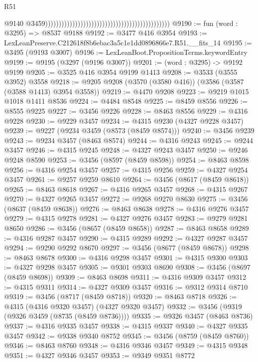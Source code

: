 \begin{lexlean}{R51}
\begin{coremodule}
                                                                                                @9140
                                                                                                @3459))))))))))))))))))))))))))))))))))))))))))))))
@9190 := fun (word : @3295) => @8537 @9188
@9192 := @3477 @416 @3954
@9193 := LexLeanPreserve.C212618f8b6ebac3a5c1e1dd0896866e7.R51.__fits_14
@9195 := @3495 (@9193 @3007)
@9196 := LexLeanBoot.PropositionTerms.keywordEntry
@9199 := @9195 (@3297 (@9196 @3007))
@9201 := (word : @3295) -> @9192 @9199
@9205 := @3525 @416 @3954 @9199 @1413
@9208 := @3533 (@3555 @3952) @3558
@9218 := @9205 @9208 (@3570 (@3580 @416)) (@3586 (@3587 (@3588 @1413) @3954 @3558))
@9219 := @4470 @9208
@9223 := @9219 @1015 @1018 @1411 @8536
@9224 := @4484 @8548
@9225 := @8459 @8556
@9226 := @8555 @9225
@9227 := @3456 @9226
@9228 := @8463 @8556
@9229 := @4316 @9228
@9230 := @9229 @3457
@9234 := @4315 @9230 (@4327 @9228 @3457)
@9239 := @9227 (@9234 @3459 (@8573 (@8459 @8574)))
@9240 := @3456 @9239
@9243 := @9234 @3457 (@8463 @8574)
@9244 := @4316 @9243
@9245 := @9244 @3457
@9246 := @4315 @9245
@9248 := @4327 @9243 @3457
@9250 := @9246 @9248 @8590
@9253 := @3456 (@8597 (@8459 @8598))
@9254 := @8463 @8598
@9256 := @4316 @9254 @3457
@9257 := @4315 @9256
@9259 := @4327 @9254 @3457
@9261 := @9257 @9259 @8610
@9264 := @3456 (@8617 (@8459 @8618))
@9265 := @8463 @8618
@9267 := @4316 @9265 @3457
@9268 := @4315 @9267
@9270 := @4327 @9265 @3457
@9272 := @9268 @9270 @8630
@9275 := @3456 (@8637 (@8459 @8638))
@9276 := @8463 @8638
@9278 := @4316 @9276 @3457
@9279 := @4315 @9278
@9281 := @4327 @9276 @3457
@9283 := @9279 @9281 @8650
@9286 := @3456 (@8657 (@8459 @8658))
@9287 := @8463 @8658
@9289 := @4316 @9287 @3457
@9290 := @4315 @9289
@9292 := @4327 @9287 @3457
@9294 := @9290 @9292 @8670
@9297 := @3456 (@8677 (@8459 @8678))
@9298 := @8463 @8678
@9300 := @4316 @9298 @3457
@9301 := @4315 @9300
@9303 := @4327 @9298 @3457
@9305 := @9301 @9303 @8690
@9308 := @3456 (@8697 (@8459 @8698))
@9309 := @8463 @8698
@9311 := @4316 @9309 @3457
@9312 := @4315 @9311
@9314 := @4327 @9309 @3457
@9316 := @9312 @9314 @8710
@9319 := @3456 (@8717 (@8459 @8718))
@9320 := @8463 @8718
@9326 := @4315 (@4316 @9320 @3457) (@4327 @9320 @3457)
@9332 := @3456 (@9319 (@9326 @3459 (@8735 (@8459 @8736))))
@9335 := @9326 @3457 (@8463 @8736)
@9337 := @4316 @9335 @3457
@9338 := @4315 @9337
@9340 := @4327 @9335 @3457
@9342 := @9338 @9340 @8752
@9345 := @3456 (@8759 (@8459 @8760))
@9346 := @8463 @8760
@9348 := @4316 @9346 @3457
@9349 := @4315 @9348
@9351 := @4327 @9346 @3457
@9353 := @9349 @9351 @8772

\end{coremodule}
\end{lexlean}
